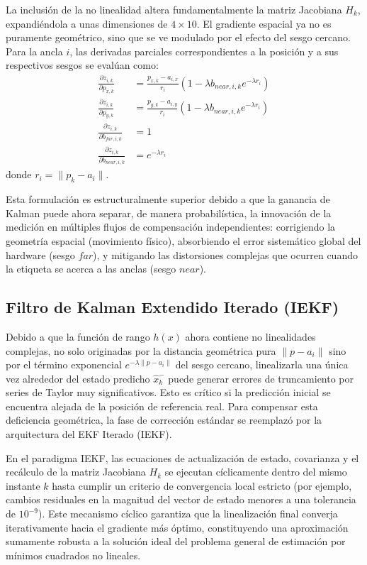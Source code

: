 La inclusión de la no linealidad altera fundamentalmente la matriz Jacobiana $H_k$, expandiéndola a unas dimensiones de $4 \times 10$. El gradiente espacial ya no es puramente geométrico, sino que se ve modulado por el efecto del sesgo cercano. Para la ancla $i$, las derivadas parciales correspondientes a la posición y a sus respectivos sesgos se evalúan como:
\begin{align}
    \frac{\partial z_{i,k}}{\partial p_{x,k}} &= \frac{p_{x,k} - a_{i,x}}{r_i} \left( 1 - \lambda b_{near,i,k} e^{-\lambda r_i} \right) \\
    \frac{\partial z_{i,k}}{\partial p_{y,k}} &= \frac{p_{y,k} - a_{i,y}}{r_i} \left( 1 - \lambda b_{near,i,k} e^{-\lambda r_i} \right) \\
    \frac{\partial z_{i,k}}{\partial b_{far,i,k}} &= 1 \\
    \frac{\partial z_{i,k}}{\partial b_{near,i,k}} &= e^{-\lambda r_i}
\end{align}
donde $r_i = \lVert p_k - a_i \rVert$. 

Esta formulación es estructuralmente superior debido a que la ganancia de Kalman puede ahora separar, de manera probabilística, la innovación de la medición en múltiples flujos de compensación independientes: corrigiendo la geometría espacial (movimiento físico), absorbiendo el error sistemático global del hardware (sesgo $far$), y mitigando las distorsiones complejas que ocurren cuando la etiqueta se acerca a las anclas (sesgo $near$).

\subsection{Filtro de Kalman Extendido Iterado (IEKF)}
Debido a que la función de rango $h(x)$ ahora contiene no linealidades complejas, no solo originadas por la distancia geométrica pura $\lVert p - a_i \rVert$ sino por el término exponencial $e^{-\lambda \lVert p - a_i \rVert}$ del sesgo cercano, linealizarla una única vez alrededor del estado predicho $\hat{x}_k^-$ puede generar errores de truncamiento por series de Taylor muy significativos. Esto es crítico si la predicción inicial se encuentra alejada de la posición de referencia real. Para compensar esta deficiencia geométrica, la fase de corrección estándar se reemplazó por la arquitectura del EKF Iterado (IEKF). 

En el paradigma IEKF, las ecuaciones de actualización de estado, covarianza y el recálculo de la matriz Jacobiana $H_k$ se ejecutan cíclicamente dentro del mismo instante $k$ hasta cumplir un criterio de convergencia local estricto (por ejemplo, cambios residuales en la magnitud del vector de estado menores a una tolerancia de $10^{-9}$). Este mecanismo cíclico garantiza que la linealización final converja iterativamente hacia el gradiente más óptimo, constituyendo una aproximación sumamente robusta a la solución ideal del problema general de estimación por mínimos cuadrados no lineales.

